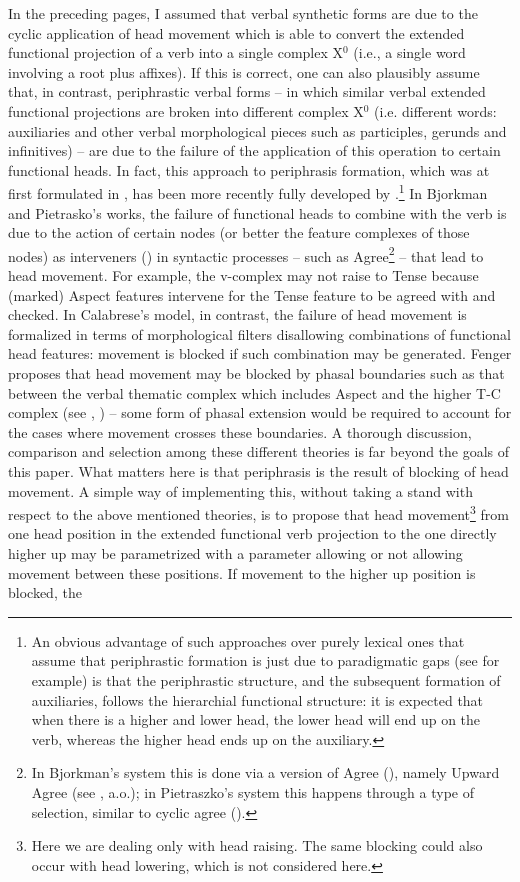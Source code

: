 \documentclass[output=paper]{langscibook}
\begin{document}
In the preceding pages, I assumed that verbal synthetic forms are due to the cyclic application of head movement which is able to convert the extended functional projection of a verb into a single complex X$^0$ (i.e., a single word involving a root plus affixes). If this is correct, one can also plausibly assume that, in contrast, periphrastic verbal forms  --  in which similar verbal extended functional projections are broken into different complex X$^0$ (i.e. different words: auxiliaries and other verbal morphological pieces such as participles, gerunds and infinitives)  --  are due to the failure of the application of this operation to certain functional heads. In fact, this approach to periphrasis formation, which was at first formulated in \cite{embick2000a}, has been more recently fully developed by \cite{bjorkman2011a, pietraszko2016a, fenger2020a, calabrese2019a}.\footnote{An obvious advantage of such approaches over purely lexical ones that assume that periphrastic formation is just due to paradigmatic gaps (see \cite{kiparsky2004a} for example) is that the periphrastic structure, and the subsequent formation of auxiliaries, follows the hierarchial functional structure: it is expected that when there is a higher and lower head, the lower head will end up on the verb, whereas the higher head ends up on the auxiliary.}  In Bjorkman and Pietrasko’s works, the failure of functional heads to combine with the verb is due to the action of certain nodes (or better the feature complexes of those nodes) as interveners (\cite{rizzi1990a}) in syntactic processes  --  such as Agree\footnote{In Bjorkman’s system this is done via a version of Agree (\cite{chomsky2000a, chomsky2001}), namely Upward Agree (see \cite{merchant2011a}, a.o.); in Pietraszko’s system this happens through a type of selection, similar to cyclic agree (\cite{bejar2009a}).}   --  that lead to head movement. For example, the v-complex may not raise to Tense because (marked) Aspect features intervene for the Tense feature to be agreed with and checked. In Calabrese’s model, in contrast, the failure of head movement is formalized in terms of morphological filters disallowing combinations of functional head features: movement is blocked if such combination may be generated. Fenger proposes that head movement may be blocked by phasal boundaries such as that between the verbal thematic complex which includes Aspect and the higher T-C complex (see \cite{bo2014a}, \cite{wurmbrand2017verb})  --  some form of phasal extension would be required to account for the cases where movement crosses these boundaries.  A thorough discussion, comparison and selection among these different theories is far beyond the goals of this paper.  What matters here is that periphrasis is the result of blocking of head movement. A simple way of implementing this, without taking a stand with respect to the above mentioned theories, is to propose that head movement\footnote{Here we are dealing only with head raising. The same blocking could also occur with head lowering, which is not considered here.}  from one head position in the extended functional verb projection to the one directly higher up may be parametrized with a parameter allowing or not allowing movement between these positions. If movement to the higher up position is blocked, the 
\end{document}
